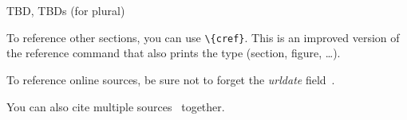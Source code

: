 \chapter{\introduction}
\label{ch:introduction}

\ac{TBD}, \acp{TBD} (for plural)

To reference other sections, you can use \texttt{\textbackslash\{cref\}}. This is an improved version of the reference command that also prints the type (section, figure, \dots).

To reference online sources, be sure not to forget the \textit{urldate} field~\cite{google}.

You can also cite multiple sources~\cite{google,KiHeKo2014-LT-DLIM} together.
